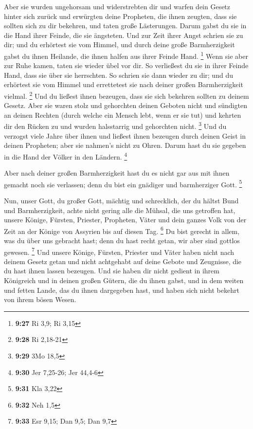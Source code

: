  Aber sie wurden ungehorsam und widerstrebten dir und
warfen dein Gesetz hinter sich zurück und erwürgten deine Propheten, die
ihnen zeugten, dass sie sollten sich zu dir bekehren, und taten große
Lästerungen.  Darum gabst du sie in die Hand ihrer
Feinde, die sie ängsteten. Und zur Zeit ihrer Angst schrien sie zu dir;
und du erhörtest sie vom Himmel, und durch deine große Barmherzigkeit
gabst du ihnen Heilande, die ihnen halfen aus ihrer Feinde Hand.
\footnote{\textbf{9:27} Ri 3,9; Ri 3,15}  Wenn sie aber
zur Ruhe kamen, taten sie wieder übel vor dir. So verließest du sie in
ihrer Feinde Hand, dass sie über sie herrschten. So schrien sie dann
wieder zu dir; und du erhörtest sie vom Himmel und errettetest sie nach
deiner großen Barmherzigkeit vielmal. \footnote{\textbf{9:28} Ri 2,18-21}
 Und du ließest ihnen bezeugen, dass sie sich bekehren
sollten zu deinem Gesetz. Aber sie waren stolz und gehorchten deinen
Geboten nicht und sündigten an deinen Rechten (durch welche ein Mensch
lebt, wenn er sie tut) und kehrten dir den Rücken zu und wurden
halsstarrig und gehorchten nicht. \footnote{\textbf{9:29} 3Mo 18,5}
 Und du verzogst viele Jahre über ihnen und ließest ihnen
bezeugen durch deinen Geist in deinen Propheten; aber sie nahmen's nicht
zu Ohren. Darum hast du sie gegeben in die Hand der Völker in den
Ländern. \footnote{\textbf{9:30} Jer 7,25-26; Jer 44,4-6}

 Aber nach deiner großen Barmherzigkeit hast du es nicht
gar aus mit ihnen gemacht noch sie verlassen; denn du bist ein gnädiger
und barmherziger Gott. \footnote{\textbf{9:31} Kla 3,22}

 Nun, unser Gott, du großer Gott, mächtig und
schrecklich, der du hältst Bund und Barmherzigkeit, achte nicht gering
alle die Mühsal, die uns getroffen hat, unsere Könige, Fürsten,
Priester, Propheten, Väter und dein ganzes Volk von der Zeit an der
Könige von Assyrien bis auf diesen Tag. \footnote{\textbf{9:32} Neh 1,5}
 Du bist gerecht in allem, was du über uns gebracht hast;
denn du hast recht getan, wir aber sind gottlos gewesen. \footnote{\textbf{9:33}
  Esr 9,15; Dan 9,5; Dan 9,7}  Und unsere Könige,
Fürsten, Priester und Väter haben nicht nach deinem Gesetz getan und
nicht achtgehabt auf deine Gebote und Zeugnisse, die du hast ihnen
lassen bezeugen.  Und sie haben dir nicht gedient in
ihrem Königreich und in deinen großen Gütern, die du ihnen gabst, und in
dem weiten und fetten Lande, das du ihnen dargegeben hast, und haben
sich nicht bekehrt von ihrem bösen Wesen.

